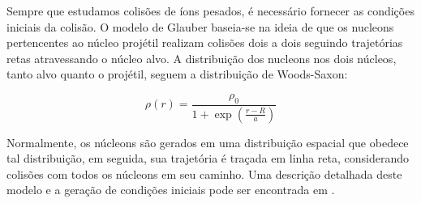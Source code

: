 Sempre que estudamos colisões de íons pesados, é necessário fornecer as condições iniciais da colisão. O modelo
de Glauber baseia-se na ideia de que os nucleons pertencentes ao núcleo projétil realizam colisões dois a dois seguindo trajetórias
retas atravessando o núcleo alvo. A distribuição dos nucleons nos dois núcleos, tanto alvo quanto o projétil, seguem a distribuição de
Woods-Saxon:

\begin{equation}
 \rho(r) = \frac{\rho_0}{1+\exp{(\frac{r-R}{a})}}
\end{equation}

Normalmente, os núcleons são gerados em uma distribuição espacial que obedece tal distribuição, em seguida, sua trajetória
é traçada em linha reta, considerando colisões com todos os núcleons em seu caminho. Uma descrição detalhada deste modelo e a
geração de condições iniciais pode ser encontrada em \cite{miller_glauber_2007}.